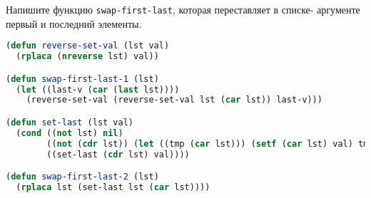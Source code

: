 Напишите функцию \verb|swap-first-last|, которая переставляет в списке-
аргументе первый и последний элементы.

\begin{lstlisting}[language=Lisp]
(defun reverse-set-val (lst val)
  (rplaca (nreverse lst) val))

(defun swap-first-last-1 (lst)
  (let ((last-v (car (last lst))))
    (reverse-set-val (reverse-set-val lst (car lst)) last-v)))

(defun set-last (lst val)
  (cond ((not lst) nil)
        ((not (cdr lst)) (let ((tmp (car lst))) (setf (car lst) val) tmp))
        ((set-last (cdr lst) val))))

(defun swap-first-last-2 (lst)
  (rplaca lst (set-last lst (car lst))))
\end{lstlisting}


